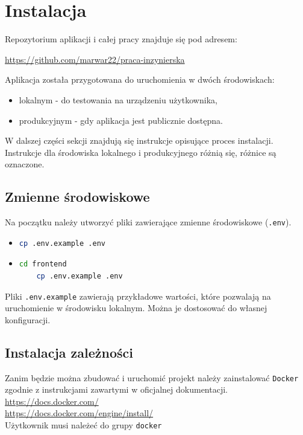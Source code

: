 \documentclass[shortabstract]{iithesis}
\begin{document}
\section{Instalacja}
\noindent
Repozytorium aplikacji i całej pracy znajduje się pod adresem:
\begin{center}
    \url{https://github.com/marwar22/praca-inzynierska}
\end{center}
\noindent
Aplikacja została przygotowana do uruchomienia w dwóch środowiskach:
\begin{itemize}
    \item lokalnym - do testowania na urządzeniu użytkownika,
    \item produkcyjnym - gdy aplikacja jest publicznie dostępna.
\end{itemize}
W dalszej części sekcji znajdują się instrukcje opisujące proces instalacji.
Instrukcje dla środowiska lokalnego i produkcyjnego różnią się, różnice są oznaczone.
\subsection{Zmienne środowiskowe}
\noindent
Na początku należy utworzyć pliki zawierające zmienne środowiskowe (\texttt{.env}).

\begin{itemize}
    \item
          \begin{lstlisting}[language=bash]
    cp .env.example .env
    \end{lstlisting}

    \item
          \begin{lstlisting}[language=bash]
    cd frontend
    cp .env.example .env
    \end{lstlisting}
\end{itemize}
Pliki \texttt{.env.example} zawierają przykładowe wartości, które pozwalają na uruchomienie w środowisku lokalnym.
Można je dostosować do własnej konfiguracji.


\subsection{Instalacja zależności}
Zanim będzie można zbudować i uruchomić projekt należy zainstalować \texttt{Docker} zgodnie z instrukcjami zawartymi w oficjalnej dokumentacji.
\\
\url{https://docs.docker.com/}
\\
\url{https://docs.docker.com/engine/install/}
\\
Użytkownik musi należeć do grupy \texttt{docker}
\end{document}
